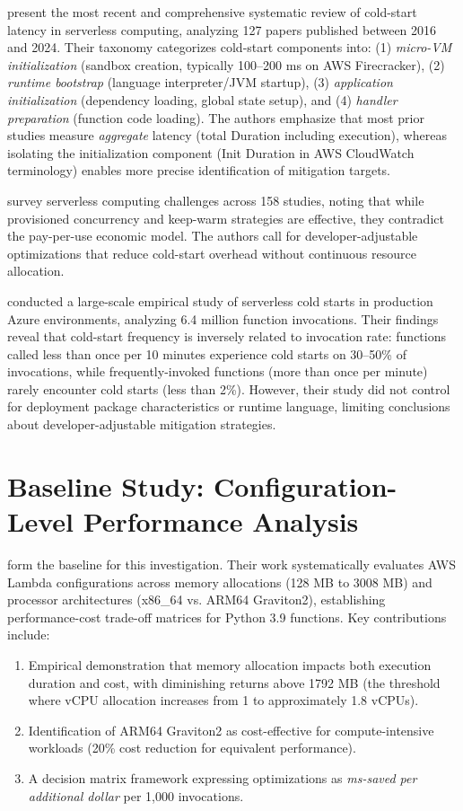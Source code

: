 \citet{golec2024coldstart} present the most recent and comprehensive systematic review of cold-start latency in serverless computing, analyzing 127 papers published between 2016 and 2024. Their taxonomy categorizes cold-start components into: (1) \textit{micro-VM initialization} (sandbox creation, typically 100–200 ms on AWS Firecracker), (2) \textit{runtime bootstrap} (language interpreter/JVM startup), (3) \textit{application initialization} (dependency loading, global state setup), and (4) \textit{handler preparation} (function code loading). The authors emphasize that most prior studies measure \textit{aggregate} latency (total Duration including execution), whereas isolating the initialization component (Init Duration in AWS CloudWatch terminology) enables more precise identification of mitigation targets.

\citet{shafiei2022survey} survey serverless computing challenges across 158 studies, noting that while provisioned concurrency and keep-warm strategies are effective, they contradict the pay-per-use economic model. The authors call for developer-adjustable optimizations that reduce cold-start overhead without continuous resource allocation.

\citet{joosen2025coldstarts} conducted a large-scale empirical study of serverless cold starts in production Azure environments, analyzing 6.4 million function invocations. Their findings reveal that cold-start frequency is inversely related to invocation rate: functions called less than once per 10 minutes experience cold starts on 30–50\% of invocations, while frequently-invoked functions (more than once per minute) rarely encounter cold starts (less than 2\%). However, their study did not control for deployment package characteristics or runtime language, limiting conclusions about developer-adjustable mitigation strategies.

\section{Baseline Study: Configuration-Level Performance Analysis}

\citet{bluemke2025ijet} form the baseline for this investigation. Their work systematically evaluates AWS Lambda configurations across memory allocations (128 MB to 3008 MB) and processor architectures (x86\_64 vs. ARM64 Graviton2), establishing performance-cost trade-off matrices for Python 3.9 functions. Key contributions include:

\begin{enumerate}
    \item Empirical demonstration that memory allocation impacts both execution duration and cost, with diminishing returns above 1792 MB (the threshold where vCPU allocation increases from 1 to approximately 1.8 vCPUs).
    \item Identification of ARM64 Graviton2 as cost-effective for compute-intensive workloads (20\% cost reduction for equivalent performance).
    \item A decision matrix framework expressing optimizations as \textit{ms-saved per additional dollar} per 1,000 invocations.
\end{enumerate}

